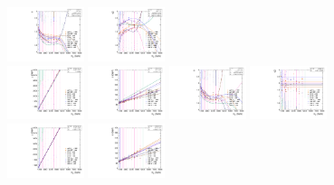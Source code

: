 \begin{figure}[htbp]
  \includegraphics[width=0.2\textwidth]{fig/analysis/paramSignalShape_allSig_MVV_LP_nobb_DEtaLo_ALPHA1.pdf}
  \includegraphics[width=0.2\textwidth]{fig/analysis/paramSignalShape_allSig_MVV_LP_nobb_DEtaLo_ALPHA2.pdf}\\
  \includegraphics[width=0.2\textwidth]{fig/analysis/paramSignalShape_allSig_MVV_HP_vbf_DEtaLo_MEAN.pdf}
  \includegraphics[width=0.2\textwidth]{fig/analysis/paramSignalShape_allSig_MVV_HP_vbf_DEtaLo_SIGMA.pdf}
  \includegraphics[width=0.2\textwidth]{fig/analysis/paramSignalShape_allSig_MVV_HP_vbf_DEtaLo_ALPHA1.pdf}
  \includegraphics[width=0.2\textwidth]{fig/analysis/paramSignalShape_allSig_MVV_HP_vbf_DEtaLo_ALPHA2.pdf}\\
  \includegraphics[width=0.2\textwidth]{fig/analysis/paramSignalShape_allSig_MVV_LP_vbf_DEtaLo_MEAN.pdf}
  \includegraphics[width=0.2\textwidth]{fig/analysis/paramSignalShape_allSig_MVV_LP_vbf_DEtaLo_SIGMA.pdf}

\end{figure}
